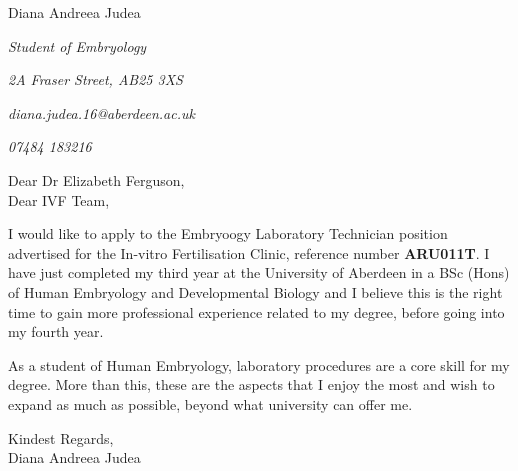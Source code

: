 \documentclass[paper=a4,fontsize=11pt]{scrartcl} %
\newcommand{\sepspace}{\vspace*{1em}}		%
\newcommand{\MyName}[1]{ %
  \Huge \usefont{OT1}{phv}{b}{n} \hfill #1
  \par \normalsize \normalfont}
\newcommand{\MySlogan}[4]{ %
  \large \usefont{OT1}{phv}{m}{n}\hfill \textit{#1} 
  \sepspace
  \par \normalsize \usefont{OT1}{phv}{m}{n}\hfill \textit{#2}
  \par \normalsize \usefont{OT1}{phv}{m}{n}\hfill \textit{#3}
  \par \normalsize \usefont{OT1}{phv}{m}{n}\hfill \textit{#4}
  \par \normalsize \normalfont}
\begin{document}
  
  \MyName{Diana Andreea Judea}
  \MySlogan{Student of Embryology}{2A Fraser Street, AB25 3XS}{diana.judea.16@aberdeen.ac.uk}{07484 183216}
  \sepspace \sepspace
  
  \noindent
  Dear Dr Elizabeth Ferguson, \\
  Dear IVF Team,
  
  \sepspace
  
    \noindent
    I would like to apply to the Embryoogy Laboratory Technician position advertised for the In-vitro Fertilisation Clinic, reference number \textbf{ARU011T}. I have just completed my third year at the University of Aberdeen in a BSc (Hons) of Human Embryology and Developmental Biology and I believe this is the right time to gain more professional experience related to my degree, before going into my fourth year.
    \sepspace
    
    
    \noindent
    
    \sepspace
    
    
    \noindent
    As a student of Human Embryology, laboratory {} procedures are a core skill for my degree. More than this, these are the aspects that I enjoy the most and wish to expand as much as possible, beyond what university can offer me.
    \sepspace


  \sepspace
  
  \noindent
  Kindest Regards, \\
  Diana Andreea Judea
  
  
  
\end{document}
